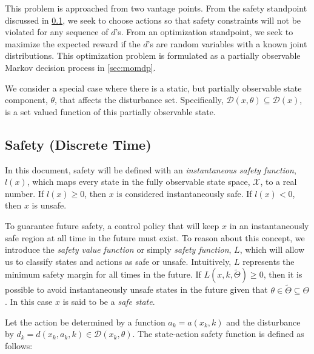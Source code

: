 \documentclass{article}
\newcommand{\aspace}{\ensuremath{\mathcal{A}} }
\newcommand{\dstate}{\theta}
\newcommand{\dsspace}{\Theta}
\newcommand{\dset}{\mathcal{D}}
\begin{document}
This problem is approached from two vantage points.
From the safety standpoint discussed in \cref{sec:safety}, we seek to choose actions so that safety constraints will not be violated for any sequence of $d$'s.
From an optimization standpoint, we seek to maximize the expected reward if the $d$'s are random variables with a known joint distributions.
This optimization problem is formulated as a partially observable Markov decision process in \cref{sec:momdp}.

We consider a special case where there is a static, but partially observable state component, $\dstate$, that affects the disturbance set.
Specifically, $\dset(x,\dstate) \subseteq \dset(x)$, is a set valued function of this partially observable state.

\subsection{Safety (Discrete Time)} \label{sec:safety}

In this document, safety will be defined with an \emph{instantaneous safety function}, $l(x)$, which maps every state in the fully observable state space, $\mathcal{X}$, to a real number.
If $l(x) \geq 0$, then $x$ is considered instantaneously safe. If $l(x) < 0$, then $x$ is unsafe.

To guarantee future safety, a control policy that will keep $x$ in an instantaneously safe region at all time in the future must exist.
To reason about this concept, we introduce the \emph{safety value function} or simply \emph{safety function}, $L$, which will allow us to classify states and actions as safe or unsafe.
Intuitively, $L$ represents the minimum safety margin for all times in the future.
If $L(x, k, \tilde{\dsspace}) \geq 0$, then it is possible to avoid instantaneously unsafe states in the future given that $\dstate \in \tilde{\dsspace} \subseteq \dsspace$.
In this case $x$ is said to be a \emph{safe state}.  

Let the action be determined by a function $a_k = a(x_k, k)$ and the disturbance by $d_k = d(x_k, a_k, k) \in \dset(x_k, \dstate)$.
The state-action safety function is defined as follows:
\end{document}
